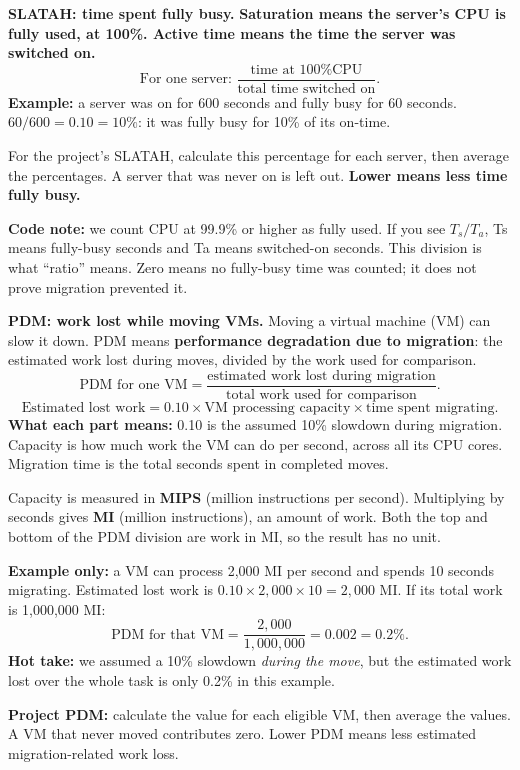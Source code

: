 \documentclass[11pt,a4paper]{article}
\begin{document}
\textbf{SLATAH: time spent fully busy.}
\textbf{Saturation means the server's CPU is fully used, at 100\%. Active time means the time the server was switched on.}
\[\text{For one server: }\frac{\text{time at 100\% CPU}}{\text{total time switched on}}.\]
\textbf{Example:} a server was on for 600 seconds and fully busy for 60 seconds. $60/600=0.10=10\%$: it was fully busy for 10\% of its on-time.

For the project's SLATAH, calculate this percentage for each server, then average the percentages. A server that was never on is left out. \textbf{Lower means less time fully busy.}

\textbf{Code note:} we count CPU at 99.9\% or higher as fully used. If you see $T_s/T_a$, Ts means fully-busy seconds and Ta means switched-on seconds. This division is what ``ratio'' means. Zero means no fully-busy time was counted; it does not prove migration prevented it.

\textbf{PDM: work lost while moving VMs.}
Moving a virtual machine (VM) can slow it down. PDM means \textbf{performance degradation due to migration}: the estimated work lost during moves, divided by the work used for comparison.
\[\text{PDM for one VM}=\frac{\text{estimated work lost during migration}}{\text{total work used for comparison}}.\]
\[\text{Estimated lost work}=0.10\times\text{VM processing capacity}\times\text{time spent migrating}.\]
\textbf{What each part means:} 0.10 is the assumed 10\% slowdown during migration. Capacity is how much work the VM can do per second, across all its CPU cores. Migration time is the total seconds spent in completed moves.

Capacity is measured in \textbf{MIPS} (million instructions per second). Multiplying by seconds gives \textbf{MI} (million instructions), an amount of work. Both the top and bottom of the PDM division are work in MI, so the result has no unit.

\textbf{Example only:} a VM can process 2,000 MI per second and spends 10 seconds migrating. Estimated lost work is $0.10\times2{,}000\times10=2{,}000$ MI. If its total work is 1,000,000 MI:
\[\text{PDM for that VM}=\frac{2{,}000}{1{,}000{,}000}=0.002=0.2\%.\]
\textbf{Hot take:} we assumed a 10\% slowdown \emph{during the move}, but the estimated work lost over the whole task is only 0.2\% in this example.

\textbf{Project PDM:} calculate the value for each eligible VM, then average the values. A VM that never moved contributes zero. Lower PDM means less estimated migration-related work loss.
\end{document}
